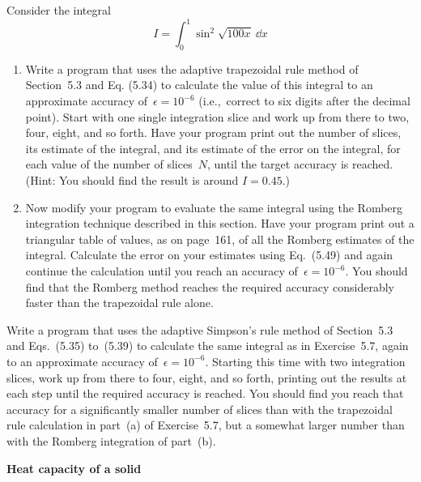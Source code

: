 \documentclass[12pt]{article}
\begin{document}
\begin{exercises}
\exercise Consider the integral
\begin{displaymath}
I = \int_0^1 \sin^2 \sqrt{100 x} \>\dd x
\end{displaymath}
\begin{enumerate}\setlength{\itemsep}{0pt}
\item Write a program that uses the adaptive trapezoidal rule method of
  Section~5.3 and Eq. (5.34) to calculate the value of this integral to an
  approximate accuracy of~$\epsilon=10^{-6}$ (i.e.,~correct to six digits
  after the decimal point).  Start with one single integration slice and
  work up from there to two, four, eight, and so forth.  Have your program
  print out the number of slices, its estimate of the integral, and its
  estimate of the error on the integral, for each value of the number of
  slices~$N$, until the target accuracy is reached.  (Hint: You should find
  the result is around $I=0.45$.)
\item Now modify your program to evaluate the same integral using the
  Romberg integration technique described in this section.  Have your
  program print out a triangular table of values, as on page~161, of all
  the Romberg estimates of the integral.  Calculate the error on your
  estimates using Eq.~(5.49) and again continue the calculation until you
  reach an accuracy of~$\epsilon=10^{-6}$.  You should find that the
  Romberg method reaches the required accuracy considerably faster than the
  trapezoidal rule alone.
\end{enumerate}



\exercise Write a program that uses the adaptive Simpson's rule method of
Section~5.3 and Eqs.~(5.35) to~(5.39) to calculate the same integral as in
Exercise~5.7, again to an approximate accuracy of~$\epsilon=10^{-6}$.
Starting this time with two integration slices, work up from there to four,
eight, and so forth, printing out the results at each step until the
required accuracy is reached.  You should find you reach that accuracy for
a significantly smaller number of slices than with the trapezoidal rule
calculation in part~(a) of Exercise~5.7, but a somewhat larger number than
with the Romberg integration of part~(b).



\exercise \textbf{Heat capacity of a solid}


\end{exercises}
\end{document}

